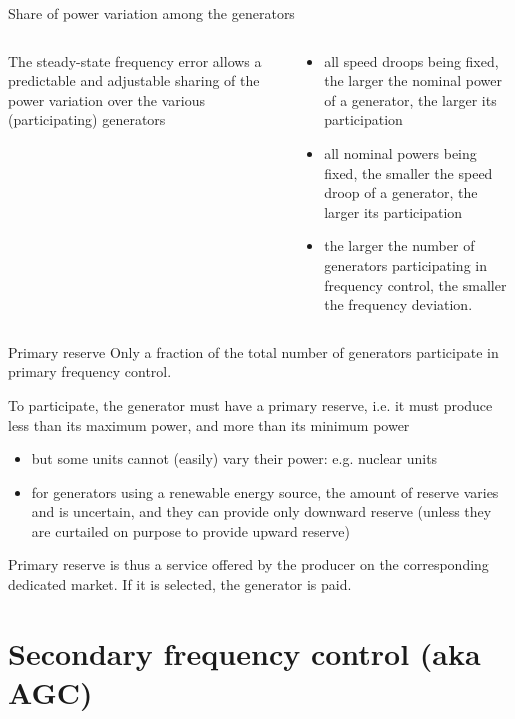 \begin{frame}[allowframebreaks]{Share of power variation among the generators}
  \begin{columns}
  \begin{column}{0.3\textwidth}  
    The steady-state frequency error allows a predictable and adjustable sharing of the power variation over the various (participating) generators 
  \end{column}
  \begin{column}{0.68\textwidth}
  \begin{itemize}
      \item all speed droops being fixed, the larger the nominal power of a generator, the larger its participation 
      \item all nominal powers being fixed, the smaller the speed droop of a generator, the larger its participation 
      \item the larger the number of generators participating in frequency control, the smaller the frequency deviation.
  \end{itemize}
  \end{column}
  \end{columns}
    
\end{frame}

\begin{frame}{Primary reserve}
    Only a fraction of the total number of generators participate in primary frequency control.

    To participate, the generator must have a primary reserve, i.e. it must produce less than its maximum power, and more than its minimum power
    \begin{itemize}
        \item but some units cannot (easily) vary their power: e.g. nuclear units 
        \item for generators using a renewable energy source, the amount of reserve varies and is uncertain, and they can provide only downward reserve (unless they are curtailed on purpose to provide upward reserve)
    \end{itemize}
    Primary reserve is thus a service offered by the producer on the corresponding dedicated market. If it is selected, the generator is paid.
\end{frame}

\section{Secondary frequency control (aka AGC)}


